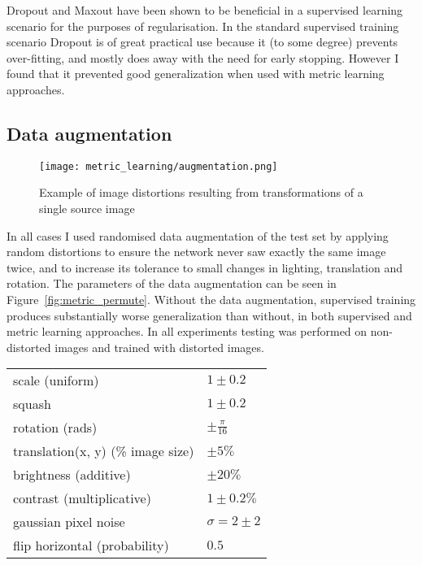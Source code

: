 Dropout and Maxout have been shown to be beneficial in a supervised learning scenario for the purposes of regularisation. In the standard supervised training scenario Dropout is of great practical use because it (to some degree) prevents over-fitting, and mostly does away with the need for early stopping. However I found that it prevented good generalization when used with metric learning approaches.

\subsection {Data augmentation}

\begin{figure}[h]
\centering
\texttt{[image: metric\_learning/augmentation.png]}
\caption{Example of image distortions resulting from transformations of a single source image}
\label{fig:metric_augmentation}
\end{figure}


In all cases I used randomised data augmentation of the test set by applying random distortions to ensure the network never saw exactly the same image twice, and to increase its tolerance to small changes in lighting, translation and rotation. The parameters of the data augmentation can be seen in Figure~\ref{fig:metric_permute}. Without the data augmentation, supervised training produces substantially worse generalization than without, in both supervised and metric learning approaches. In all experiments testing was performed on non-distorted images and trained with distorted images.

\begin{table*}
  \centering
    \caption{Ranges of parameters used for image distortion }

  \begin{tabular}{ l  l }
    \toprule
    scale (uniform) & $ 1 \pm 0.2 $  \\ 
    squash  & $ 1 \pm 0.2 $  \\ 
    rotation (rads) & $ \pm \frac{\pi}{16} $ \\ 
    translation(x, y) (\% image size) & $ \pm 5 \% $ \\ 
    brightness (additive) & $ \pm 20 \% $ \\ 
    contrast (multiplicative) & $ 1 \pm 0.2 \% $ \\ 
    gaussian pixel noise & $ \sigma = 2 \pm 2 $  \\ 
    flip horizontal (probability) & $ 0.5 $ \\ 
    \bottomrule
  \end{tabular}
\label{fig:metric_permute}
\end{table*}

